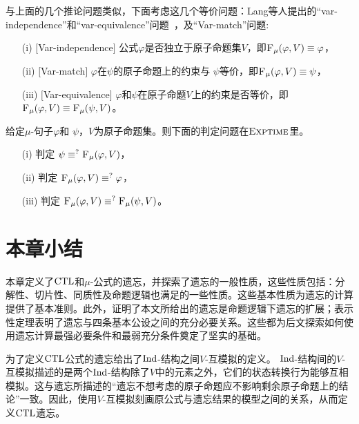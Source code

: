 与上面的几个推论问题类似，下面考虑这几个等价问题：Lang等人提出的“var-independence”和“var-equivalence”问题~\cite{DBLP:journals/jair/LangLM03}，及“Var-match”问题:
\begin{itemize}
	\item[(i)] $[$Var-independence$]$ 公式$\varphi$是否独立于原子命题集$V$，即${\textsc{F}_{\textsc{$\mu$}}}(\varphi,V) \equiv \varphi$，
	\item[(ii)] $[$Var-match$]$  $\varphi$在$\psi$的原子命题上的约束与 $\psi$等价，即${\textsc{F}_{\textsc{$\mu$}}}(\varphi, V) \equiv \psi$，
	\item[(iii)] $[$Var-equivalence$]$  $\varphi$和$\psi$在原子命题$V$上的约束是否等价，即${\textsc{F}_{\textsc{$\mu$}}}(\varphi, V) \equiv {\textsc{F}_{\textsc{$\mu$}}}(\psi, V)$。
\end{itemize}

\begin{corollary}\label{chapter06:cor:equiv}
	给定$\mu$-句子$\varphi$和 $\psi$，$V$为原子命题集。则下面的判定问题在$\textsc{Exptime}$里。
	\begin{itemize}
		\item[(i)] 判定 $\psi \equiv^?{\textsc{F}_{\textsc{$\mu$}}}(\varphi, V)$，
		\item[(ii)] 判定 ${\textsc{F}_{\textsc{$\mu$}}}(\varphi, V) \equiv^? \varphi$，
		\item[(iii)] 判定 ${\textsc{F}_{\textsc{$\mu$}}}(\varphi, V) \equiv^? {\textsc{F}_{\textsc{$\mu$}}}(\psi, V)$。
	\end{itemize}
\end{corollary}


\section{本章小结}
本章定义了$\textrm{CTL}$和$\mu$-公式的遗忘，并探索了遗忘的一般性质，这些性质包括：分解性、切片性、同质性及命题逻辑也满足的一些性质。这些基本性质为遗忘的计算提供了基本准则。此外，证明了本文所给出的遗忘是命题逻辑下遗忘的扩展；表示性定理表明了遗忘与四条基本公设之间的充分必要关系。这些都为后文探索如何使用遗忘计算最强必要条件和最弱充分条件奠定了坚实的基础。

为了定义$\textrm{CTL}$公式的遗忘给出了$\textrm{Ind}$-结构之间$V$-互模拟的定义。
$\textrm{Ind}$-结构间的$V$-互模拟描述的是两个$\textrm{Ind}$-结构除了$V$中的元素之外，它们的状态转换行为能够互相模拟。这与遗忘所描述的“遗忘不想考虑的原子命题应不影响剩余原子命题上的结论”一致。因此，使用$V$-互模拟刻画原公式与遗忘结果的模型之间的关系，从而定义$\textrm{CTL}$遗忘。


